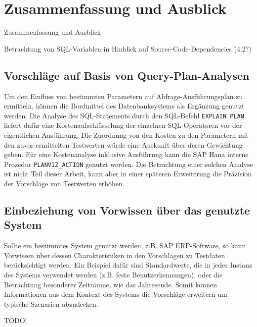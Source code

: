 \section{Zusammenfassung und Ausblick}\label{chap:conclusion}

%
%

Zusammenfassung und Ausblick


Betrachtung von SQL-Variablen in Hinblick auf Source-Code-Dependencies (4.2?)

\subsection{Vorschläge auf Basis von Query-Plan-Analysen}
Um den Einfluss von bestimmten Parametern auf Abfrage-Ausführungsplan zu ermitteln, können die Bordmittel des Datenbanksystems als Ergänzung genutzt werden.
Die Analyse des SQL-Statements durch den SQL-Befehl \texttt{EXPLAIN PLAN} liefert dafür eine Kostenaufschlüsselung der einzelnen SQL-Operatoren vor der eigentlichen Ausführung.
Die Zuordnung von den Kosten zu den Parametern mit den zuvor ermittelten Testwerten würde eine Auskunft über deren Gewichtung geben.
Für eine Kostenanalyse inklusive Ausführung kann die SAP Hana interne Prozedur \texttt{PLANVIZ\_ACTION} genutzt werden.
Die Betrachtung einer solchen Analyse ist nicht Teil dieser Arbeit, kann aber in einer späteren Erweiterung die Präzision der Vorschläge von Testwerten erhöhen.

\subsection{Einbeziehung von Vorwissen über das genutzte System}
Sollte ein bestimmtes System genutzt werden, z.B. SAP ERP-Software, so kann Vorwissen über dessen Charakteristiken in den Vorschlägen zu Testdaten berücksichtigt werden.
Ein Beispiel dafür sind Standardwerte, die in jeder Instanz des Systems verwendet werden (z.B. feste Benutzerkennungen), oder die Betrachtung besonderer Zeiträume, wie das Jahresende.
Somit können Informationen aus dem Kontext des Systems die Vorschläge erweitern um typische Szenarien abzudecken.



TODO!